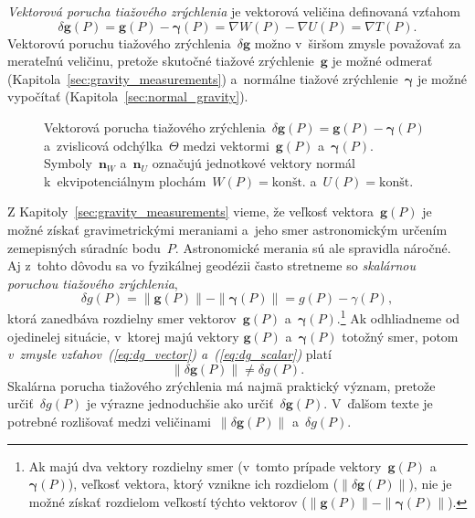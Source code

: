 \documentclass[a4paper, 12pt]{book}
\let\vec\mathbf
\begin{document}
\emph{Vektorová porucha tiažového zrýchlenia} je vektorová veličina definovaná 
vzťahom
%
\begin{equation}
\label{eq:dg_vector}
\delta \vec g(P) = \vec g(P) - \boldsymbol \gamma(P) = \nabla W(P) - \nabla 
U(P) = \nabla T(P){.}
\end{equation}
%
Vektorovú poruchu tiažového zrýchlenia~$\delta \vec g$ možno v~širšom zmysle 
považovať za merateľnú veličinu, pretože skutočné tiažové zrýchlenie~$\vec g$ 
je možné odmerať (Kapitola~\ref{sec:gravity_measurements}) a~normálne tiažové 
zrýchlenie~$\boldsymbol\gamma$ je možné vypočítať 
(Kapitola~\ref{sec:normal_gravity}).

\begin{figure}[bt]
\centering

\caption{Vektorová porucha tiažového zrýchlenia~$\delta \vec g(P) = \vec g(P) 
- \boldsymbol\gamma(P)$ a~zvislicová odchýlka~$\Theta$ medzi vektormi~$\vec 
g(P)$ a~$\boldsymbol\gamma(P)$.  Symboly~$\vec n_W$ a~$\vec n_U$ označujú 
jednotkové vektory normál k~ekvipotenciálnym plochám~$W(P) 
= \textrm{kon\v{s}t.}$ a~$U(P) = \textrm{kon\v{s}t.}$}
\label{fig:gravity_disturbance}
\end{figure}

Z Kapitoly~\ref{sec:gravity_measurements} vieme, že veľkosť vektora~$\vec g(P)$ 
je možné získať gravimetrickými meraniami a~jeho smer astronomickým určením 
zemepisných súradníc bodu~$P$.  Astronomické merania sú ale spravidla náročné.  
Aj z~tohto dôvodu sa vo fyzikálnej geodézii často stretneme so \emph{skalárnou 
poruchou tiažového zrýchlenia},
%
\begin{equation}
\label{eq:dg_scalar}
\delta g(P) = \| \vec g(P) \| - \| \boldsymbol \gamma(P) \| = g(P) 
- \gamma(P){,}
\end{equation}
%
ktorá zanedbáva rozdielny smer vektorov~$\vec g(P)$ a~$\boldsymbol 
\gamma(P)$.\footnote{Ak majú dva vektory rozdielny smer (v~tomto prípade 
vektory~$\vec g(P)$ a~$\boldsymbol \gamma(P)$), veľkosť vektora, ktorý vznikne 
ich rozdielom ($\| \delta \vec g(P) \|$), nie je možné získať rozdielom 
veľkostí týchto vektorov ($\| \vec g(P) \| - \| \boldsymbol \gamma(P) \|$).}  
Ak odhliadneme od ojedinelej situácie, v~ktorej majú vektory $\vec g(P)$ 
a~$\boldsymbol{\gamma}(P)$ totožný smer, potom \emph{v~zmysle 
vzťahov~(\ref{eq:dg_vector}) a~(\ref{eq:dg_scalar})} platí
%
\begin{equation}
\| \delta \vec g(P) \| \neq \delta g(P){.}
\end{equation}
%
Skalárna porucha tiažového zrýchlenia má najmä praktický význam, pretože 
určiť~$\delta g(P)$ je výrazne jednoduchšie ako určiť~$\delta \vec g(P)$.  
V~ďalšom texte je potrebné rozlišovať medzi veličinami~$\| \delta \vec g(P) \|$ 
a~$\delta g(P)$.
\end{document}
